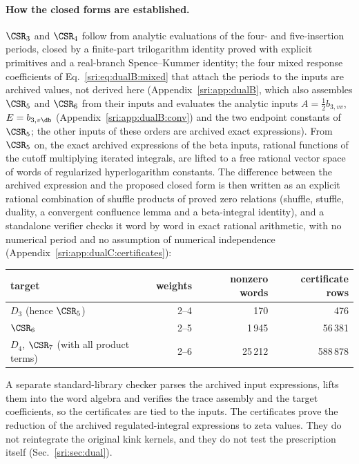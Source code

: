 \paragraph{How the closed forms are established.} $\CSR_3$ and $\CSR_4$ follow from analytic evaluations of the
four- and five-insertion periods, closed by a finite-part trilogarithm identity proved with explicit primitives and a
real-branch Spence--Kummer identity; the four mixed response coefficients of Eq.~\eqref{sri:eq:dualB:mixed} that attach the
periods to the inputs are archived values, not derived here (Appendix~\ref{sri:app:dualB}, which also assembles $\CSR_5$ and $\CSR_6$ from
their inputs and evaluates the analytic inputs $A=\tfrac12b_{3,vv}$, $E=b_{3,v\db}$ (Appendix~\ref{sri:app:dualB:conv}) and the two
endpoint constants of $\CSR_5$; the other inputs of
these orders are archived exact expressions). From $\CSR_5$ on, the exact archived expressions of the beta inputs, rational
functions of the cutoff multiplying iterated integrals, are lifted to a free rational vector space of words of
regularized hyperlogarithm constants. The difference between the archived expression and the proposed closed form is
then written as an explicit rational combination of shuffle products of proved zero relations (shuffle, stuffle,
duality, a convergent confluence lemma and a beta-integral identity), and a standalone verifier checks it word by
word in exact rational arithmetic, with no numerical period and no assumption of numerical independence
(Appendix~\ref{sri:app:dualC:certificates}):
\begin{center}\small
\begin{tabular}{@{}lrrr@{}}
\toprule
target & weights & nonzero words & certificate rows\\
\midrule
$D_3$ (hence $\CSR_5$) & 2--4 & 170 & 476\\
$\CSR_6$ & 2--5 & 1\,945 & 56\,381\\
$D_4$, $\CSR_7$ (with all product terms) & 2--6 & 25\,212 & 588\,878\\
\bottomrule
\end{tabular}
\end{center}
A separate standard-library checker parses the archived input expressions, lifts them into the word algebra and
verifies the trace assembly and the target coefficients, so the certificates are tied to the inputs. The certificates
prove the reduction of the archived regulated-integral expressions to zeta values. They do not reintegrate the
original kink kernels, and they do not test the prescription itself (Sec.~\ref{sri:sec:dual}).

